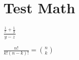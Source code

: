 \section{Test Math}
\begin{center}
$\frac{\frac{1}{x}+\frac{1}{y}}{y-z}$

$\frac{n!}{k!(n-k)!} = \binom{n}{k}$
\end{center}
